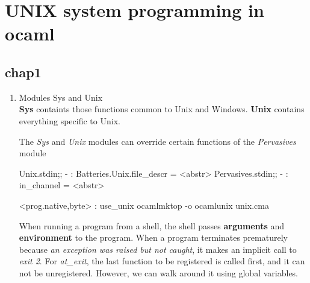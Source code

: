 \section{UNIX system programming in ocaml}
\label{sec:unix-syst-progr}

\subsection{chap1}
\label{sec:chap1}

\begin{enumerate}
\item Modules Sys and Unix \\
  \textbf{Sys} containts those functions common to Unix and Windows.
  \textbf{Unix} contains everything specific to Unix.

  The \textit{Sys} and \textit{Unix} modules can override certain
  functions of the \textit{Pervasives} module
  \begin{alternate}
Unix.stdin;;
- : Batteries.Unix.file_descr = <abstr>
Pervasives.stdin;;
- : in_channel = <abstr>
\end{alternate}

\begin{bluecode}
  <prog.{native,byte}> : use_unix
  ocamlmktop -o ocamlunix unix.cma
\end{bluecode}

When running a program from a shell, the shell passes \textbf{arguments} and
\textbf{environment} to the program. When a program terminates
prematurely because \textit{an exception was raised but not caught}, it makes
an implicit call to \textit{exit 2}. For \textit{at\_exit}, the last
function to be registered is called first, and it can not be
unregistered. However, we can walk around it using global variables.


\end{enumerate}
